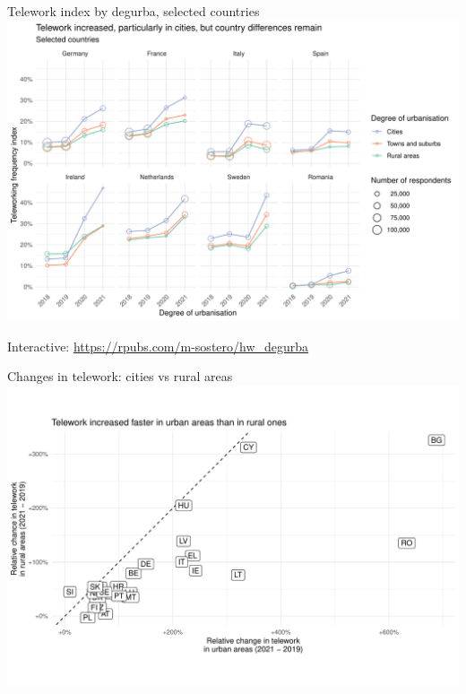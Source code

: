 \documentclass[10pt,handout]{beamer}
\begin{document}
\begin{frame}{Telework index by degurba, selected countries }
\pause
\centering
\includegraphics[width=\textwidth,height=0.9\textheight,keepaspectratio]{Telework_degurba_selected.pdf}

Interactive: \url{https://rpubs.com/m-sostero/hw\_degurba}
\end{frame}

\begin{frame}{Changes in telework: cities vs rural areas}
\pause
\centering
\includegraphics[width=\textwidth,height=0.9\textheight,keepaspectratio]{Telework_changes_degurba.pdf}
\end{frame}
\end{document}
